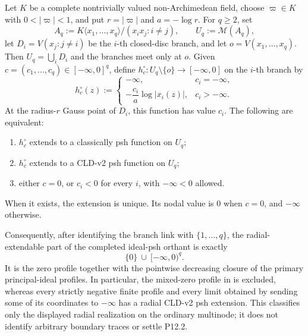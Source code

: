\begin{theorem}
\label{thm:p122-multinode-radial-psh-classification}
Let \(K\) be a complete nontrivially valued non-Archimedean field, choose
\(\varpi\in K\) with \(0<|\varpi|<1\), and put
\(r=|\varpi|\) and \(a=-\log r\).  For \(q\geq2\), set
\[
 A_q:=K\langle x_1,\ldots,x_q\rangle/
             (x_ix_j:i\ne j),
 \qquad U_q:=\mathcal M(A_q),
\]
let \(D_i=V(x_j:j\ne i)\) be the \(i\)-th closed-disc branch, and let
\(o=V(x_1,\ldots,x_q)\).  Then
\(U_q=\bigcup_iD_i\) and the branches meet only at \(o\).  Given
\(c=(c_1,\ldots,c_q)\in[-\infty,0]^q\), define
\(h_c^\circ:U_q\setminus\{o\}\to[-\infty,0]\) on the \(i\)-th branch by
\[
 h_c^\circ(z):=
 \begin{cases}
  -\infty,&c_i=-\infty,\\[1mm]
  -\dfrac{c_i}{a}\log|x_i(z)|,&c_i> -\infty.
 \end{cases}
 \tag{\(\blacktriangle\)}\label{eq:p122-multinode-radial-function}
\]
At the radius-\(r\) Gauss point of \(D_i\), this function has value \(c_i\).
The following are equivalent:
\begin{enumerate}
\item \(h_c^\circ\) extends to a classically psh function on \(U_q\);
\item \(h_c^\circ\) extends to a CLD-v2 psh function on \(U_q\);
\item either \(c=0\), or \(c_i<0\) for every \(i\), with
      \(-\infty<0\) allowed.
\end{enumerate}
When it exists, the extension is unique.  Its nodal value is \(0\) when
\(c=0\), and \(-\infty\) otherwise.

Consequently, after identifying the branch link with \(\{1,\ldots,q\}\),
the radial-extendable part of the completed ideal-psh orthant is exactly
\[
                 \{0\}\ \cup\ [-\infty,0)^q.
 \tag{\(\blacklozenge\)}\label{eq:p122-multinode-radial-psh-cone}
\]
It is the zero profile together with the pointwise decreasing closure of
the primary principal-ideal profiles.  In particular, the mixed-zero
profile in  is excluded, whereas
every strictly negative finite profile and every limit obtained by sending
some of its coordinates to \(-\infty\) has a radial CLD-v2 psh extension.
This classifies only the displayed radial realization on the ordinary
multinode; it does not identify arbitrary boundary traces or settle P12.2.
\end{theorem}

